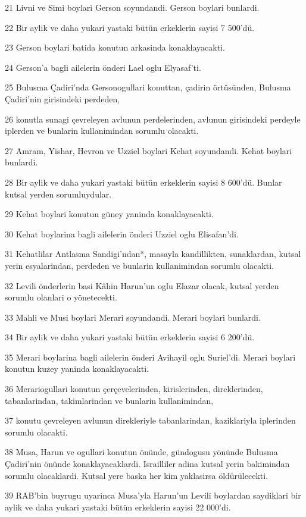 \par 21 Livni ve Simi boylari Gerson soyundandi. Gerson boylari bunlardi.
\par 22 Bir aylik ve daha yukari yastaki bütün erkeklerin sayisi 7 500'dü.
\par 23 Gerson boylari batida konutun arkasinda konaklayacakti.
\par 24 Gerson'a bagli ailelerin önderi Lael oglu Elyasaf'ti.
\par 25 Bulusma Çadiri'nda Gersonogullari konuttan, çadirin örtüsünden, Bulusma Çadiri'nin girisindeki perdeden,
\par 26 konutla sunagi çevreleyen avlunun perdelerinden, avlunun girisindeki perdeyle iplerden ve bunlarin kullanimindan sorumlu olacakti.
\par 27 Amram, Yishar, Hevron ve Uzziel boylari Kehat soyundandi. Kehat boylari bunlardi.
\par 28 Bir aylik ve daha yukari yastaki bütün erkeklerin sayisi 8 600'dü. Bunlar kutsal yerden sorumluydular.
\par 29 Kehat boylari konutun güney yaninda konaklayacakti.
\par 30 Kehat boylarina bagli ailelerin önderi Uzziel oglu Elisafan'di.
\par 31 Kehatlilar Antlasma Sandigi'ndan*, masayla kandillikten, sunaklardan, kutsal yerin esyalarindan, perdeden ve bunlarin kullanimindan sorumlu olacakti.
\par 32 Levili önderlerin basi Kâhin Harun'un oglu Elazar olacak, kutsal yerden sorumlu olanlari o yönetecekti.
\par 33 Mahli ve Musi boylari Merari soyundandi. Merari boylari bunlardi.
\par 34 Bir aylik ve daha yukari yastaki bütün erkeklerin sayisi 6 200'dü.
\par 35 Merari boylarina bagli ailelerin önderi Avihayil oglu Suriel'di. Merari boylari konutun kuzey yaninda konaklayacakti.
\par 36 Merariogullari konutun çerçevelerinden, kirislerinden, direklerinden, tabanlarindan, takimlarindan ve bunlarin kullanimindan,
\par 37 konutu çevreleyen avlunun direkleriyle tabanlarindan, kaziklariyla iplerinden sorumlu olacakti.
\par 38 Musa, Harun ve ogullari konutun önünde, gündogusu yönünde Bulusma Çadiri'nin önünde konaklayacaklardi. Israilliler adina kutsal yerin bakimindan sorumlu olacaklardi. Kutsal yere baska her kim yaklasirsa öldürülecekti.
\par 39 RAB'bin buyrugu uyarinca Musa'yla Harun'un Levili boylardan saydiklari bir aylik ve daha yukari yastaki bütün erkeklerin sayisi 22 000'di.

